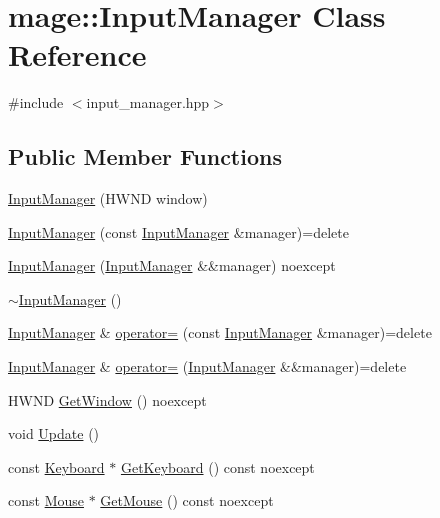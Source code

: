 \hypertarget{classmage_1_1_input_manager}{}\section{mage\+:\+:Input\+Manager Class Reference}
\label{classmage_1_1_input_manager}


{\ttfamily \#include $<$input\+\_\+manager.\+hpp$>$}

\subsection*{Public Member Functions}
\begin{DoxyCompactItemize}
\item 
\hyperlink{classmage_1_1_input_manager_a23cc1e28f376a126a4dfe606efe2824d}{Input\+Manager} (H\+W\+ND window)
\item 
\hyperlink{classmage_1_1_input_manager_a43ef7028cce3be1c7e48067810638e69}{Input\+Manager} (const \hyperlink{classmage_1_1_input_manager}{Input\+Manager} \&manager)=delete
\item 
\hyperlink{classmage_1_1_input_manager_a91ec89b9b721f686bfd932187144742e}{Input\+Manager} (\hyperlink{classmage_1_1_input_manager}{Input\+Manager} \&\&manager) noexcept
\item 
\hyperlink{classmage_1_1_input_manager_a287ca0e91ec079227c102f7eadd5bb46}{$\sim$\+Input\+Manager} ()
\item 
\hyperlink{classmage_1_1_input_manager}{Input\+Manager} \& \hyperlink{classmage_1_1_input_manager_af274778a476cc52758f7083b6f74ea34}{operator=} (const \hyperlink{classmage_1_1_input_manager}{Input\+Manager} \&manager)=delete
\item 
\hyperlink{classmage_1_1_input_manager}{Input\+Manager} \& \hyperlink{classmage_1_1_input_manager_a0cd7904b0cfe9a3d0c7b47f5913a54f9}{operator=} (\hyperlink{classmage_1_1_input_manager}{Input\+Manager} \&\&manager)=delete
\item 
H\+W\+ND \hyperlink{classmage_1_1_input_manager_a21d07df65018d5dcc1511afe7310dc85}{Get\+Window} () noexcept
\item 
void \hyperlink{classmage_1_1_input_manager_a5e516969ff4ae9876b98c28f48f93726}{Update} ()
\item 
const \hyperlink{classmage_1_1_keyboard}{Keyboard} $\ast$ \hyperlink{classmage_1_1_input_manager_a2ceb6e20c122f7029cb75b970a11d58d}{Get\+Keyboard} () const noexcept
\item 
const \hyperlink{classmage_1_1_mouse}{Mouse} $\ast$ \hyperlink{classmage_1_1_input_manager_aae51ef1fb225466d956f75372f166e38}{Get\+Mouse} () const noexcept
\end{DoxyCompactItemize}
